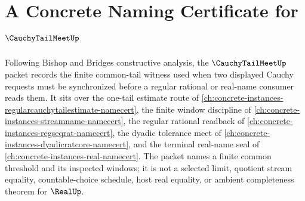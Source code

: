 \chapter{A Concrete Naming Certificate for $\CauchyTailMeetUp$}
\label{ch:concrete-instances-cauchy-tail-meet-namecert}

Following Bishop and Bridges constructive analysis, the $\CauchyTailMeetUp$ packet records the finite common-tail witness used when two displayed Cauchy requests must be synchronized before a regular rational or real-name consumer reads them. It sits over the one-tail estimate route of \autoref{ch:concrete-instances-regularcauchytailestimate-namecert}, the finite window discipline of \autoref{ch:concrete-instances-streamname-namecert}, the regular rational readback of \autoref{ch:concrete-instances-regseqrat-namecert}, the dyadic tolerance meet of \autoref{ch:concrete-instances-dyadicratcore-namecert}, and the terminal real-name seal of \autoref{ch:concrete-instances-real-namecert}. The packet names a finite common threshold and its inspected windows; it is not a selected limit, quotient stream equality, countable-choice schedule, host real equality, or ambient completeness theorem for $\RealUp$.


